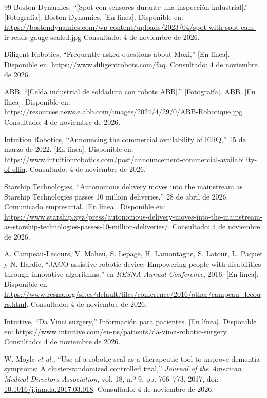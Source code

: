 \documentclass[11pt,a4paper]{article}
\begin{document}
\begin{thebibliography}{99}
Boston Dynamics. ``[Spot con sensores durante una inspección industrial].'' [Fotografía]. Boston Dynamics. [En línea]. Disponible en: \url{https://bostondynamics.com/wp-content/uploads/2023/04/spot-with-spot-cam-ir-reads-gauge-scaled.jpg} Consultado: 4 de noviembre de 2026.

Diligent Robotics, ``Frequently asked questions about Moxi,''
[En línea]. Disponible en: \url{https://www.diligentrobots.com/faq}. Consultado: 4 de noviembre de 2026.

ABB. ``[Celda industrial de soldadura con robots ABB].'' [Fotografía]. ABB. [En línea]. Disponible en: \url{https://resources.news.e.abb.com/images/2024/4/29/0/ABB-Robotique.jpg} Consultado: 4 de noviembre de 2026.

Intuition Robotics, ``Announcing the commercial availability of ElliQ,'' 15 de marzo de 2022. [En línea]. Disponible en: \url{https://www.intuitionrobotics.com/post/announcement-commercial-availability-of-elliq}. Consultado: 4 de noviembre de 2026.

Starship Technologies, ``Autonomous delivery moves into the mainstream as Starship Technologies passes 10 million deliveries,'' 28 de abril de 2026. Comunicado empresarial.
[En línea]. Disponible en: \url{https://www.starship.xyz/press/autonomous-delivery-moves-into-the-mainstream-as-starship-technologies-passes-10-million-deliveries/}. Consultado: 4 de noviembre de 2026.

A. Campeau-Lecours, V. Maheu, S. Lepage, H. Lamontagne, S. Latour, L. Paquet y N. Hardie, ``JACO assistive robotic device: Empowering people with disabilities through innovative algorithms,'' en \emph{RESNA Annual Conference}, 2016. [En línea]. Disponible en: \url{https://www.resna.org/sites/default/files/conference/2016/other/campeau_lecours.html}. Consultado: 4 de noviembre de 2026.

Intuitive, ``Da Vinci surgery,'' Información para pacientes.
[En línea]. Disponible en: \url{https://www.intuitive.com/en-us/patients/da-vinci-robotic-surgery}. Consultado: 4 de noviembre de 2026.

W. Moyle \emph{et al.}, ``Use of a robotic seal as a therapeutic tool to improve dementia symptoms: A cluster-randomized controlled trial,'' \emph{Journal of the American Medical Directors Association}, vol. 18, n.º 9, pp. 766--773, 2017, doi: \href{https://doi.org/10.1016/j.jamda.2017.03.018}{10.1016/j.jamda.2017.03.018}. Consultado: 4 de noviembre de 2026.


\end{thebibliography}
\end{document}
